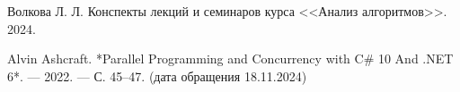 \begin{thebibliography}{}
   Волкова Л. Л. Конспекты лекций и семинаров курса <<Анализ алгоритмов>>. 2024.

   Alvin Ashcraft. *Parallel Programming and Concurrency with C\# 10 And .NET 6*. — 2022. — С. 45–47. (дата обращения 18.11.2024)


\end{thebibliography}
